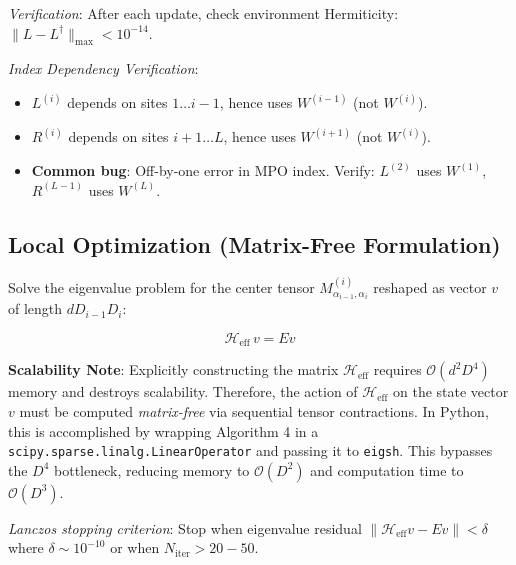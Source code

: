 \documentclass[aps,prb,onecolumn,scriptaddress]{revtex4-2}
\newcommand{\Order}{\mathcal{O}}
\begin{document}
	\textit{Verification}: After each update, check environment Hermiticity: $\|L - L^\dagger\|_{\max} < 10^{-14}$.
	
	\textit{Index Dependency Verification}:
	\begin{itemize}
		\item $L^{(i)}$ depends on sites $1 \dots i-1$, hence uses $W^{(i-1)}$ (not $W^{(i)}$).
		\item $R^{(i)}$ depends on sites $i+1 \dots L$, hence uses $W^{(i+1)}$ (not $W^{(i)}$).
		\item \textbf{Common bug}: Off-by-one error in MPO index. Verify: $L^{(2)}$ uses $W^{(1)}$, $R^{(L-1)}$ uses $W^{(L)}$.
	\end{itemize}
	
	\subsection{Local Optimization (Matrix-Free Formulation)}
	Solve the eigenvalue problem for the center tensor $M^{(i)}_{\alpha_{i-1},\alpha_i}$ reshaped as vector $v$ of length $d D_{i-1} D_i$:
	
	\begin{equation}
		\mathcal{H}_{\text{eff}} \, v = E v
	\end{equation}
	
	\textbf{Scalability Note}: Explicitly constructing the matrix $\mathcal{H}_{\text{eff}}$ requires $\Order(d^2 D^4)$ memory and destroys scalability. Therefore, the action of $\mathcal{H}_{\text{eff}}$ on the state vector $v$ must be computed \textit{matrix-free} via sequential tensor contractions. In Python, this is accomplished by wrapping Algorithm 4 in a \texttt{scipy.sparse.linalg.LinearOperator} and passing it to \texttt{eigsh}. This bypasses the $D^4$ bottleneck, reducing memory to $\Order(D^2)$ and computation time to $\Order(D^3)$.
	
	\textit{Lanczos stopping criterion}: Stop when eigenvalue residual $\|\mathcal{H}_{\text{eff}}v - Ev\| < \delta$ where $\delta \sim 10^{-10}$ or when $N_{\text{iter}} > 20-50$.
	
\end{document}
